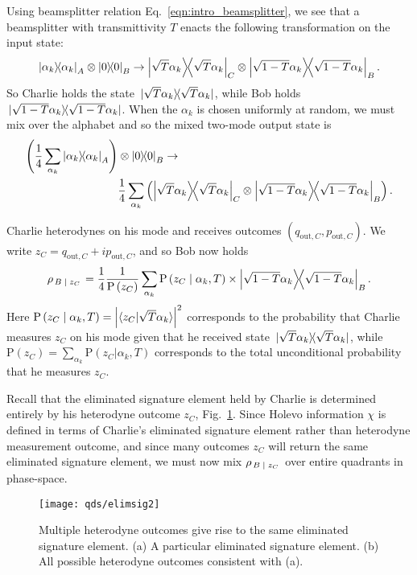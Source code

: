 Using beamsplitter relation Eq.~\ref{eqn:intro_beamsplitter}, we see that a beamsplitter with transmittivity $T$ enacts the following transformation on the input state:
\begin{equation}\label{eqn:qds_coherent_state_beamsplitter}
\dyad{\alpha_k}_A \otimes \dyad{0}_B \rightarrow \dyad{\sqrt{T} \alpha_k}_C \otimes \dyad{\sqrt{1-T}\alpha_k}_{B}.
\end{equation}
So Charlie holds the state $\dyad*{\sqrt{T}\alpha_k}$, while Bob holds $\dyad*{\sqrt{1-T}\alpha_k}$. When the $\alpha_k$ is chosen uniformly at random, we must mix over the alphabet and so the mixed two-mode output state is
\begin{align}\label{eqn:qds_after_channel}
\left(\frac{1}{4}\sum_{\alpha_k} \dyad{\alpha_k}_A\right) &\otimes \dyad{0}_B \rightarrow \notag \\
&\frac{1}{4}\sum_{\alpha_k} \left(\dyad{\sqrt{T}\alpha_k}_C \otimes \dyad{\sqrt{1-T}\alpha_k}_B\right).
\end{align}

\noindent Charlie heterodynes on his mode and receives outcomes $\left(q_{\text{out}, C}, p_{\text{out}, C} \right)$. We write $z_C = q_{\text{out}, C} + i p_{\text{out}, C}$, and so Bob now holds
\begin{equation}\label{eqn:qds_bob_conditional_state}
\rho_{\left. B \given z_C \right.} = \frac{1}{4}\frac{1}{\text{P}\left(z_C\right)}\sum_{\alpha_k} \text{P}\left(z_C \given \alpha_k, T\right) \times \dyad{\sqrt{1-T}\alpha_k}_B.
\end{equation}
Here $\text{P}\left(z_C \; \middle| \; \alpha_k, T\right) = \left| \langle z_C | \sqrt{T}\alpha_k\rangle \right|^2$ corresponds to the probability that Charlie measures $z_C$ on his mode given that he received state $\dyad*{\sqrt{T}\alpha_k}$, while $\text{P}\left(z_C\right) = \sum_{\alpha_k} \text{P}\left(z_C | \alpha_k, T\right)$ corresponds to the total unconditional probability that he measures $z_C$.

Recall that the eliminated signature element held by Charlie is determined entirely by his heterodyne outcome $z_C$, Fig.~\ref{fig:qds_elimsig2}. Since Holevo information $\chi$ is defined in terms of Charlie's eliminated signature element rather than heterodyne measurement outcome, and since many outcomes $z_C$ will return the same eliminated signature element, we must now mix $\rho_{\left. B \; \middle| \; z_C \right.}$ over entire quadrants in phase-space.

\begin{figure}[htp]
\captionsetup{width=0.8\linewidth}
\centering
\texttt{[image: qds/elimsig2]}
\caption{\label{fig:qds_elimsig2} Multiple heterodyne outcomes give rise to the same eliminated signature element. (a) A particular eliminated signature element. (b) All possible heterodyne outcomes consistent with (a).}
\end{figure}



